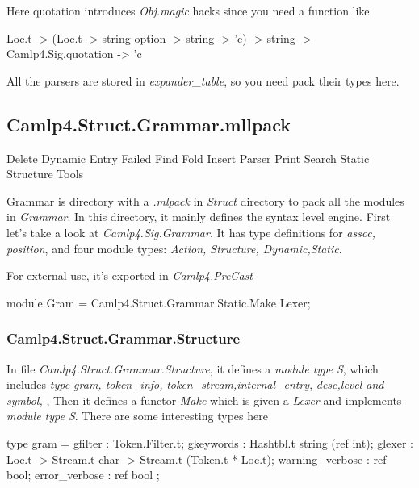   Here quotation introduces \textit{Obj.magic} hacks since you need a
  function like

  \begin{ocamlcode}
    Loc.t -> (Loc.t -> string option -> string -> 'c) ->
    string -> Camlp4.Sig.quotation -> 'c
  \end{ocamlcode}

  All the parsers are stored in \textit{expander\_table}, so you need
  pack their types here. 

\subsection{Camlp4.Struct.Grammar.mllpack}
\label{Camlp4.Struct.Grammar}

\begin{bashcode}
Delete
Dynamic
Entry
Failed
Find
Fold
Insert
Parser
Print
Search
Static
Structure
Tools
\end{bashcode}

Grammar is directory with a \textit{.mlpack} in \textit{Struct}
directory to pack all the modules in \textit{Grammar}. In this
directory, it mainly defines the syntax level engine.  First let's
take a look at \textit{Camlp4.Sig.Grammar}.  It has type definitions
for \textit{assoc, position}, and four module types: \textit{Action,
  Structure, Dynamic,Static}.

For external use, it's exported in \textit{Camlp4.PreCast}

\begin{ocamlcode}
  module Gram = Camlp4.Struct.Grammar.Static.Make Lexer;
\end{ocamlcode}

\subsubsection{Camlp4.Struct.Grammar.Structure}
\label{Camlp4.Struct.Grammar.Structure}

In file \textit{Camlp4.Struct.Grammar.Structure}, it defines a
\textit{module type S}, which includes \textit{type gram,
  token\_info,} \textit{token\_stream,internal\_entry},
\textit{desc,level and symbol, }, Then it defines a functor
\textit{Make} which is given a \textit{Lexer} and implements
\textit{module type S}. There are some interesting types here

\begin{ocamlcode}
  type gram =
    { gfilter         : Token.Filter.t;
      gkeywords       : Hashtbl.t string (ref int);
      glexer          : Loc.t -> Stream.t char -> Stream.t (Token.t * Loc.t);
      warning_verbose : ref bool;
      error_verbose   : ref bool };
\end{ocamlcode}

